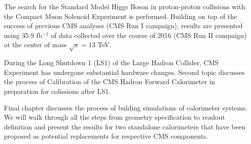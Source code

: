 The search for the Standard Model Higgs Boson in proton-proton collisions with the Compact Muon Solenoid Experiment is performed. Building on top of the success of previous CMS analyses (CMS Run I campaign), results are presented using 35.9 fb$^{-1}$ of data collected over the course of 2016 (CMS Run II campaign) at the center of mass $\sqrt{s} = 13$ TeV.

During the Long Shutdown 1 (LS1) of the Large Hadron Collider, CMS Experiment has undergone substantial hardware changes. Second topic discusses the process of Calibration of the CMS Hadron Forward Calorimeter in preparation for colissions after LS1.

Final chapter discusses the process of bulding simulations of calorimeter systems. We will walk through all the steps from geometry specification to readout definition and present the results for two standalone calorimeters that have been proposed as potential replacements for respective CMS components.